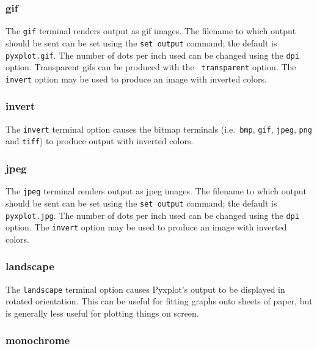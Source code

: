 \subsubsection{gif}

The {\tt gif} terminal renders output as gif images. The filename to which
output should be sent can be set using the {\tt set output} command; the
default is {\tt pyxplot.gif}. The number of dots per inch used can be changed
using the {\tt dpi} option. Transparent gifs can be produced with the {\tt
transparent} option. The {\tt invert} option may be used to produce an image
with inverted colors.


\subsubsection{invert}

The {\tt invert} terminal option causes the bitmap terminals (i.e.\ {\tt bmp},
{\tt gif}, {\tt jpeg}, {\tt png} and {\tt tiff}) to produce output with
inverted colors.


\subsubsection{jpeg}

The {\tt jpeg} terminal renders output as jpeg images. The filename to which
output should be sent can be set using the {\tt set output} command; the
default is {\tt pyxplot.jpg}.  The number of dots per inch used can be changed
using the {\tt dpi} option. The {\tt invert} option may be used to produce an
image with inverted colors.


\subsubsection{landscape}

The {\tt landscape} terminal option causes Pyxplot's output to be displayed in
rotated orientation.  This can be useful for fitting graphs onto sheets of
paper, but is generally less useful for plotting things on screen.


\subsubsection{monochrome}

